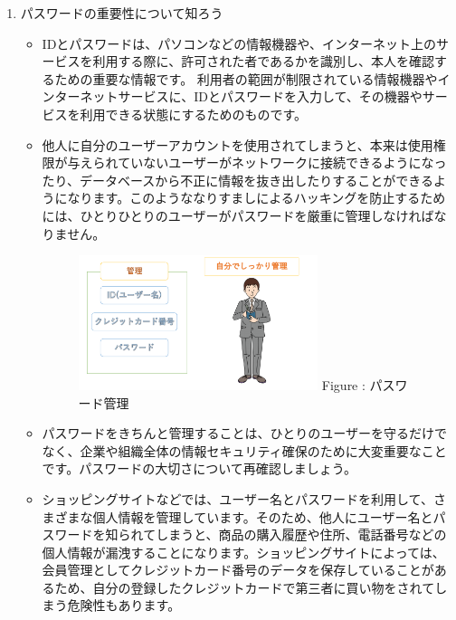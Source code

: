 \documentclass[a4paper,12pt]{jarticle}
\begin{document}
\begin{enumerate}
\clearpage
    \item
            パスワードの重要性について知ろう
            \begin{itemize}
              \item
                  IDとパスワードは、パソコンなどの情報機器や、インターネット上のサービスを利用する際に、許可された者であるかを識別し、本人を確認するための重要な情報です。 利用者の範囲が制限されている情報機器やインターネットサービスに、IDとパスワードを入力して、その機器やサービスを利用できる状態にするためのものです。
                  \item
                  他人に自分のユーザーアカウントを使用されてしまうと、本来は使用権限が与えられていないユーザーがネットワークに接続できるようになったり、データベースから不正に情報を抜き出したりすることができるようになります。このようななりすましによるハッキングを防止するためには、ひとりひとりのユーザーがパスワードを厳重に管理しなければなりません。
                  \begin{figure}[h]
                    \centering
                    \begin{minipage}{5.228cm}
                      {\upshape
                        \includegraphics[width=7.000cm]{pswd_image_imp3.pdf}
                        \newline
                        Figure {\theFigure\label{seq:refFigure12}}:
                        パスワード管理}
                    \end{minipage}
                  \end{figure}
                  \item
                  パスワードをきちんと管理することは、ひとりのユーザーを守るだけでなく、企業や組織全体の情報セキュリティ確保のために大変重要なことです。パスワードの大切さについて再確認しましょう。
                  \item
                  ショッピングサイトなどでは、ユーザー名とパスワードを利用して、さまざまな個人情報を管理しています。そのため、他人にユーザー名とパスワードを知られてしまうと、商品の購入履歴や住所、電話番号などの個人情報が漏洩することになります。ショッピングサイトによっては、会員管理としてクレジットカード番号のデータを保存していることがあるため、自分の登録したクレジットカードで第三者に買い物をされてしまう危険性もあります。

\end{itemize}
\end{enumerate}
\end{document}
